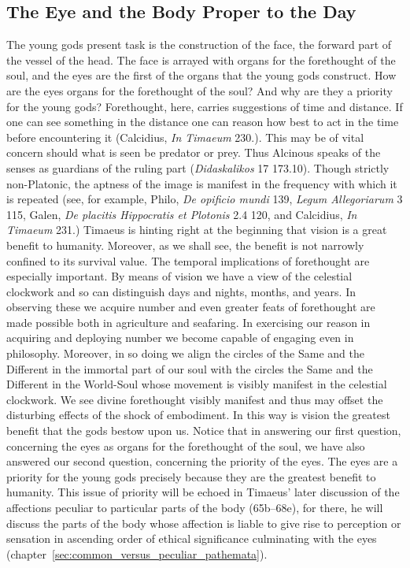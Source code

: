 \subsection{The Eye and the Body Proper to the Day} %
\label{sub:the_eye_and_the_body_proper_to_the_day}

The young gods present task is the construction of the face, the forward part of the vessel of the head. The face is arrayed with organs for the forethought of the soul, and the eyes are the first of the organs that the young gods construct. How are the eyes organs for the forethought of the soul? And why are they a priority for the young gods? Forethought, here, carries suggestions of time and distance. If one can see something in the distance one can reason how best to act in the time before encountering it (Calcidius, \emph{In Timaeum} 230.). This may be of vital concern should what is seen be predator or prey. Thus Alcinous speaks of the senses as guardians of the ruling part (\emph{Didaskalikos} 17 173.10). Though strictly non-Platonic, the aptness of the image is manifest in the frequency with which it is repeated (see, for example, Philo, \emph{De opificio mundi} 139, \emph{Legum Allegoriarum} 3 115, Galen, \emph{De placitis Hippocratis et Plotonis} 2.4 120, and Calcidius, \emph{In Timaeum} 231.) Timaeus is hinting right at the beginning that vision is a great benefit to humanity. Moreover, as we shall see, the benefit is not narrowly confined to its survival value. The temporal implications of forethought are especially important. By means of vision we have a view of the celestial clockwork and so can distinguish days and nights, months, and years. In observing these we acquire number and even greater feats of forethought are made possible both in agriculture and seafaring. In exercising our reason in acquiring and deploying number we become capable of engaging even in philosophy. Moreover, in so doing we align the circles of the Same and the Different in the immortal part of our soul with the circles the Same and the Different in the World-Soul whose movement is visibly manifest in the celestial clockwork. We see divine forethought visibly manifest and thus may offset the disturbing effects of the shock of embodiment. In this way is vision the greatest benefit that the gods bestow upon us. Notice that in answering our first question, concerning the eyes as organs for the forethought of the soul, we have also answered our second question, concerning the priority of the eyes. The eyes are a priority for the young gods precisely because they are the greatest benefit to humanity. This issue of priority will be echoed in Timaeus' later discussion of the affections peculiar to particular parts of the body (65b–68e), for there, he will discuss the parts of the body whose affection is liable to give rise to perception or sensation in ascending order of ethical significance culminating with the eyes (chapter~\ref{sec:common_versus_peculiar_pathemata}).

